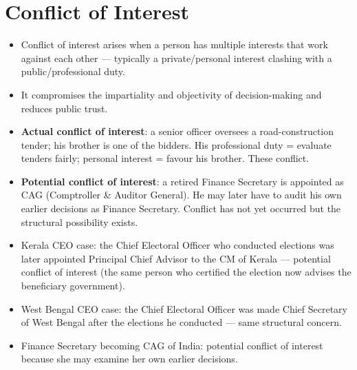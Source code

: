 \section{Conflict of Interest}

\begin{KeyConcept}
\begin{itemize}
\item Conflict of interest arises when a person has multiple interests that work against each other --- typically a private/personal interest clashing with a public/professional duty.
\item It compromises the impartiality and objectivity of decision-making and reduces public trust.
\end{itemize}
\end{KeyConcept}

\begin{ExampleBox}
\begin{itemize}
\item \textbf{Actual conflict of interest}: a senior officer oversees a road-construction tender; his brother is one of the bidders. His professional duty = evaluate tenders fairly; personal interest = favour his brother. These conflict.
\item \textbf{Potential conflict of interest}: a retired Finance Secretary is appointed as CAG (Comptroller \& Auditor General). He may later have to audit his own earlier decisions as Finance Secretary. Conflict has not yet occurred but the structural possibility exists.
\end{itemize}
\end{ExampleBox}

\begin{DataFact}
\begin{itemize}
\item Kerala CEO case: the Chief Electoral Officer who conducted elections was later appointed Principal Chief Advisor to the CM of Kerala --- potential conflict of interest (the same person who certified the election now advises the beneficiary government).
\item West Bengal CEO case: the Chief Electoral Officer was made Chief Secretary of West Bengal after the elections he conducted --- same structural concern.
\item Finance Secretary becoming CAG of India: potential conflict of interest because she may examine her own earlier decisions.
\end{itemize}
\end{DataFact}

